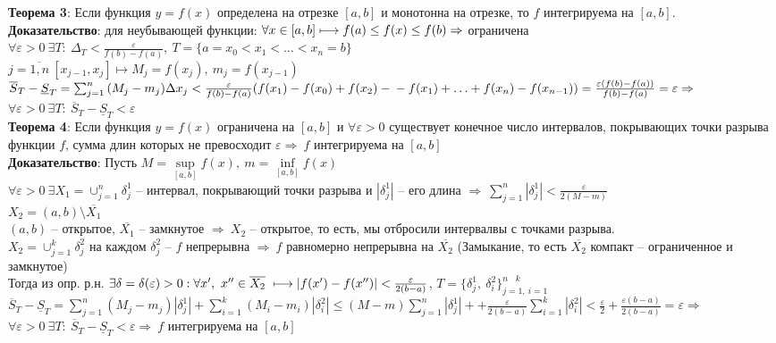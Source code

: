 \documentclass[a4paper,12pt]{article} %
\begin{document}
\noindent \textbf{Теорема 3}: Если функция $y=f(x)$ определена на отрезке $[a,b]$ и монотонна на отрезке, то $f$ интегрируема на $[a,b]$.\\
\noindent \textbf{Доказательство}: для неубывающей функции: $\forall x\in[a,b]\longmapsto\\
f(a)\leq f(x) \leq f(b)\Rightarrow$ ограничена\\
$\forall\varepsilon>0~\exists T:~\Delta_T<\frac{\varepsilon}{f(b)-f(a)},~T=\{a=x_0<x_1<{\dots}<x_n=b\}$\\
$j=\overline{1,n}~[x_{j-1},x_j]\longmapsto
M_j=f(x_j),~m_j=f(x_{j-1})$\\
$\overline{S}_T-\underline{S}_T=\sum^{n}_{j=1}{(M_j-m_j)\Delta x_j}<\frac{\varepsilon}{f(b)-f(a)}(f(x_1)-f(x_0)+f(x_2)-\\
-f(x_1)+{\dots}+f(x_n)-f(x_{n-1}))=\frac{\varepsilon(f(b)-f(a))}{f(b)-f(a)}=\varepsilon\Rightarrow$\\
$\forall\varepsilon>0~\exists T:~\overline{S}_T-\underline{S}_T<\varepsilon$\\

\noindent \textbf{Теорема 4}: Если функция $y=f(x)$ ограничена на $[a,b]$ и $\forall\varepsilon>0$ существует конечное число интервалов, покрывающих точки разрыва функции $f$, сумма длин которых не превосходит $\varepsilon\Rightarrow~f$ интегрируема на $[a,b]$\\
\noindent \textbf{Доказательство}: Пусть $M=\sup\limits_{[a,b]}{f(x)},~m=\inf\limits_{[a,b]}{f(x)}$\\
$\forall \varepsilon>0~\exists X_1=\cup^{n}_{j=1}{\delta^{1}_j}$ -- интервал, покрывающий точки разрыва и $|\delta^{1}_j|$ -- его длина $\Rightarrow~\sum^{n}_{j=1}{|\delta^{1}_j|}<\frac{\varepsilon}{2(M-m)}$\\
$X_2=(a,b)\setminus\overline{X_1}$ \\
$(a,b)$ -- открытое, $\overline{X_1}$ -- замкнутое $\Rightarrow~X_2$ -- открытое, то есть, мы отбросили интервалвы с точками разрыва.\\
$X_2=\cup^{k}_{j=1}{\delta^{2}_j}$ на каждом $\delta^{2}_j$ -- $f$ непрерывна $\Rightarrow~f$ равномерно непрерывна на $\overline{X_2}$ (Замыкание, то есть $\overline{X_2}$ компакт -- ограниченное и замкнутое)\\

Тогда из опр. р.н. $\exists\delta=\delta(\varepsilon)>0: \forall x^{\prime},~x^{\prime\prime} \in \overline{X_2}~ \longmapsto\\|f(x^{\prime})-f(x^{\prime\prime})|<\frac{\varepsilon}{2(b-a)}$, $T=\{\delta^{1}_j,~\delta^{2}_i\}^{n~~~~k}_{j=1,~i=1}$\\
$\overline{S}_T-\underline{S}_T=\sum^{n}_{j=1}{(M_j-m_j)|\delta^{1}_j|}+\sum^{k}_{i=1}{(M_i-m_i)|\delta^{2}_i|}\leq(M-m)\sum^{n}_{j=1}{|\delta^{1}_j|}+
+\frac{\varepsilon}{2(b-a)}\sum^{k}_{i=1}{|\delta^{2}_i|}<\frac{\varepsilon}{2}+\frac{\varepsilon(b-a)}{2(b-a)}=\varepsilon\Rightarrow$\\
$\forall\varepsilon>0~\exists T:~\overline{S}_T-\underline{S}_T<\varepsilon\Rightarrow~f$ интегрируема на $[a,b]$\\
\end{document}
